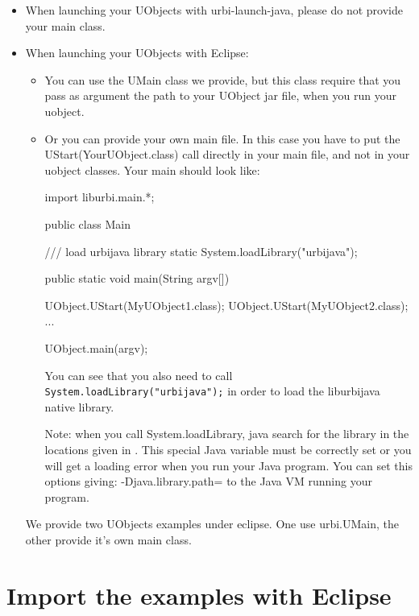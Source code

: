 \begin{itemize}

\item When launching your UObjects with urbi-launch-java, please do not provide your main class.

\item When launching your UObjects with Eclipse:
\begin{itemize}
\item You can use the UMain class we provide, but this class require that you pass as argument the path to your UObject jar file, when you run your uobject.
\item Or you can provide your own main file. In this case you have to put the UStart(YourUObject.class) call directly in your main file, and not in your
uobject classes. Your main should look like:

\begin{cxx}
import liburbi.main.*;

public class Main {

    /// load urbijava library
    static {
        System.loadLibrary("urbijava");
    }

    public static void main(String argv[]) {
      UObject.UStart(MyUObject1.class);
      UObject.UStart(MyUObject2.class);
      ...

      UObject.main(argv);
    }
}
\end{cxx}

You can see that you also need to call \lstinline{System.loadLibrary("urbijava");} in order to load the liburbijava native library.

Note: when you call System.loadLibrary, java search for the library in the locations given
in . This special Java variable must be correctly set or you
will get a loading error when you run your Java program.
You can set this options giving: -Djava.library.path=
to the Java VM running your program.


\end{itemize}

We provide two UObjects examples under eclipse. One use urbi.UMain, the other provide it's own main class.
\end{itemize}


\section{Import the examples with Eclipse}
\label{sec:uob:apijava:import}

